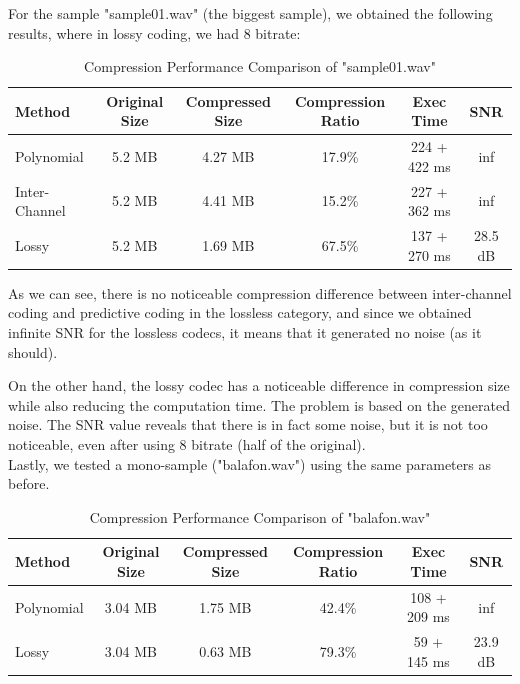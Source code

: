 \documentclass[a4paper,14pt]{article}
\begin{document}
For the sample "sample01.wav" (the biggest sample), we obtained the following results, where in lossy coding, we had 8 bitrate:
\begin{table}[H]
\centering
\begin{tabular}{|l|c|c|c|c|c|}
\hline
\textbf{Method} & \textbf{Original Size} & \textbf{Compressed Size} & \textbf{Compression Ratio} & \textbf{Exec Time} & \textbf{SNR}\\
\hline
Polynomial & 5.2 MB & 4.27 MB & 17.9\% & 224 + 422 ms & inf\\ 
Inter-Channel & 5.2 MB & 4.41 MB & 15.2\% & 227 + 362 ms & inf\\
Lossy & 5.2 MB & 1.69 MB & 67.5\% & 137 + 270 ms & 28.5 dB\\
\hline
\end{tabular}
\caption{Compression Performance Comparison of "sample01.wav"}
\end{table}


As we can see, there is no noticeable compression difference between inter-channel coding and predictive coding in the lossless category, and since we obtained infinite SNR for the lossless codecs, it means that it generated no noise (as it should). 

On the other hand, the lossy codec has a noticeable difference in compression size while also reducing the computation time. The problem is based on the generated noise. The SNR value reveals that there is in fact some noise, but it is not too noticeable, even after using 8 bitrate (half of the original). \\



Lastly, we tested a mono-sample ("balafon.wav") using the same parameters as before.
\begin{table}[H]
\centering
\begin{tabular}{|l|c|c|c|c|c|}
\hline
\textbf{Method} & \textbf{Original Size} & \textbf{Compressed Size} & \textbf{Compression Ratio} & \textbf{Exec Time} & \textbf{SNR}\\
\hline
Polynomial & 3.04 MB & 1.75 MB & 42.4\% & 108 + 209 ms & inf\\ 
Lossy & 3.04 MB & 0.63 MB & 79.3\% & 59 + 145 ms & 23.9 dB\\
\hline
\end{tabular}
\caption{Compression Performance Comparison of "balafon.wav"}
\end{table}
\end{document}
